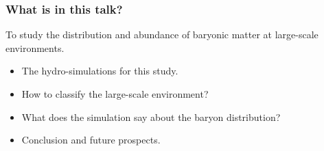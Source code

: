 \documentclass[aspectratio=43]{beamer}
\begin{document}
\begin{frame}
  \frametitle{What is in this talk?}
  To study the distribution and abundance of baryonic matter at large-scale environments.
  \begin{itemize}
    \item<1-> The hydro-simulations for this study.
    \item<2-> How to classify the large-scale environment?
    \item<3-> What does the simulation say about the baryon distribution?
    \item<4-> Conclusion and future prospects.
  \end{itemize}
\end{frame}
\end{document}
